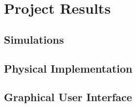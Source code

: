 
\section{Project Results}
\subsection{Simulations}

\subsection{Physical Implementation}


\subsection{Graphical User Interface}

